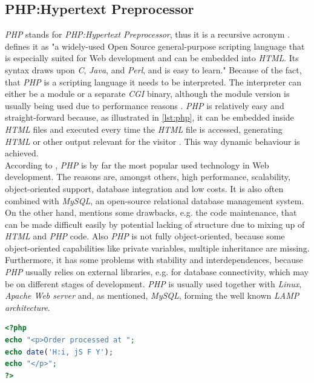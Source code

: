 \documentclass[
  a4paper,               %
  twoside,               %
  headings=small,        %
  DIV=12,                %
  BCOR=1cm,              %
  headinclude=true,      %
  footinclude=true,      %
  numbers=noenddot,      %
  11pt]{scrartcl}        %
\begin{document}
\subsection{PHP:Hypertext Preprocessor}

\emph{PHP} stands for \emph{PHP:Hypertext Preprocessor}, thus it is a recursive acronym \cite{PHPPreface}. \cite{PHPPreface} defines it as "a widely-used Open Source general-purpose scripting language that is especially suited for Web development and can be embedded into \textit{HTML}. Its syntax draws upon \textit{C}, \textit{Java}, and \textit{Perl}, and is easy to learn." Because of the fact, that \textit{PHP} is a scripting language it needs to be interpreted. The interpreter can either be a module or a separate \textit{CGI} binary, although the module version is usually being used due to performance reasons \cite{welling2008php}. \textit{PHP} is relatively easy and straight-forward because, as illustrated in \autoref{lst:php}, it can be embedded inside \textit{HTML} files and executed every time the \textit{HTML} file is accessed, generating \textit{HTML} or other output relevant for the visitor \cite{welling2008php}. This way dynamic behaviour is achieved.\\
According to \cite{w3TechsStats}, \textit{PHP} is by far the most popular used technology in Web development. The reasons are, amongst others, high performance, scalability, object-oriented support, database integration and low costs. It is also often combined with \textit{MySQL}, an open-source relational database management system. On the other hand, \cite{bowen2002apache} mentions some drawbacks, e.g. the code maintenance, that can be made difficult easily by potential lacking of structure due to mixing up of \textit{HTML} and \textit{PHP} code. Also \textit{PHP} is not fully object-oriented, because some object-oriented capabilities like private variables, multiple inheritance are missing. Furthermore, it has some problems with stability and interdependences, because \textit{PHP} usually relies on external libraries, e.g. for database connectivity, which may be on different stages of development. \textit{PHP} is usually used together with \textit{Linux}, \textit{Apache Web server} and, as mentioned, \textit{MySQL}, forming the well known \textit{LAMP architecture}. 


\begin{lstlisting}[language=php, captionpos=b,caption={PHP embedded in HTML. Taken from \cite{welling2008php}},label=lst:php]
<?php
echo "<p>Order processed at ";
echo date('H:i, jS F Y');
echo "</p>";
?>
\end{lstlisting}
\end{document}
